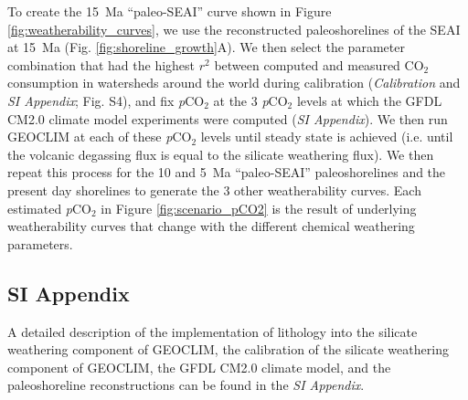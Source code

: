 \documentclass[9pt,twocolumn,twoside,lineno]{pnas-new}
\newcommand{\pCOtwo}{\textit{p}CO$_{2}$\xspace}
\newcommand{\COtwo}{CO$_{2}$\xspace}
\newcommand{\SI}{\textit{SI Appendix}\xspace}
\begin{document}
{To create the 15~Ma ``paleo-SEAI'' curve shown in Figure \ref{fig:weatherability_curves}, we use the reconstructed paleoshorelines of the SEAI at 15~Ma (Fig. \ref{fig:shoreline_growth}A). We then select the parameter combination that had the highest $r^{2}$ between computed and measured \COtwo consumption in watersheds around the world during calibration (\textit{Calibration} and \SI; Fig. S4), and fix \pCOtwo at the 3 \pCOtwo levels at which the GFDL CM2.0 climate model experiments were computed (\SI). We then run GEOCLIM at each of these \pCOtwo levels until steady state is achieved (i.e. until the volcanic degassing flux is equal to the silicate weathering flux). We then repeat this process for the 10 and 5~Ma ``paleo-SEAI'' paleoshorelines and the present day shorelines to generate the 3 other weatherability curves. Each estimated \pCOtwo in Figure \ref{fig:scenario_pCO2} is the result of underlying weatherability curves that change with the different chemical weathering parameters.

\subsection*{SI Appendix}

A detailed description of the implementation of lithology into the silicate weathering component of GEOCLIM, the calibration of the silicate weathering component of GEOCLIM, the GFDL CM2.0 climate model, and the paleoshoreline reconstructions can be found in the \SI.
}

\showmatmethods{} %


\showacknow{} %


\end{document}

